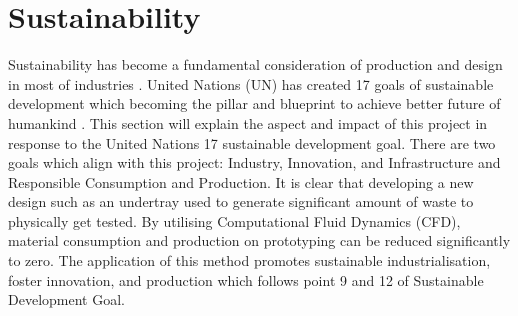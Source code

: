 \section{Sustainability}

\noindent Sustainability has become a fundamental consideration of production and design in most of industries \cite{Gates2021HowDisaster}. United Nations (UN) has created 17 goals of sustainable development which becoming the pillar and blueprint to achieve better future of humankind \cite{THEDevelopmentb}. This section will explain the aspect and impact of this project in response to the United Nations 17 sustainable development goal. There are two goals which align with this project: Industry, Innovation, and Infrastructure and Responsible Consumption and Production. It is clear that developing a new design such as an undertray used to generate significant amount of waste to physically get tested. By utilising Computational Fluid Dynamics (CFD), material consumption and production on prototyping can be reduced significantly to zero. The application of this method promotes sustainable industrialisation, foster innovation, and production which follows point 9 and 12 of Sustainable Development Goal.

